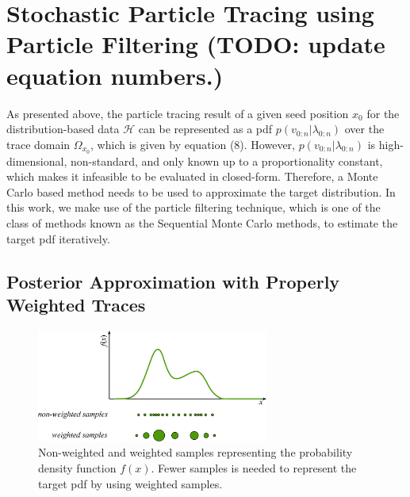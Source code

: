 \section{Stochastic Particle Tracing using Particle Filtering (TODO: update equation numbers.)}

As presented above, the particle tracing result of a given seed position $x_0$ for the distribution-based data $\mathcal{H}$ can be represented as a pdf $p({v_{0:n}}|{\lambda_{0:n}})$ over the trace domain $\Omega_{x_0}$, which is given by equation (8). However, $p({v_{0:n}}|{\lambda_{0:n}})$ is high-dimensional, non-standard, and only known up to a proportionality constant, which makes it infeasible to be evaluated in closed-form. Therefore, a Monte Carlo based method needs to be used to approximate the target distribution. In this work, we make use of the particle filtering technique, which is one of the class of methods known as the Sequential Monte Carlo methods, to estimate the target pdf iteratively.

\subsection{Posterior Approximation with Properly Weighted Traces}

\begin{figure}[htb]
  \centering
  \includegraphics[width=3in]{../figures/importance_sampling.eps}
  \caption{Non-weighted and weighted samples representing the probability density function $f(x)$. Fewer samples is needed to represent the target pdf by using weighted samples.}
  \label{importance_sampling}
\end{figure}

